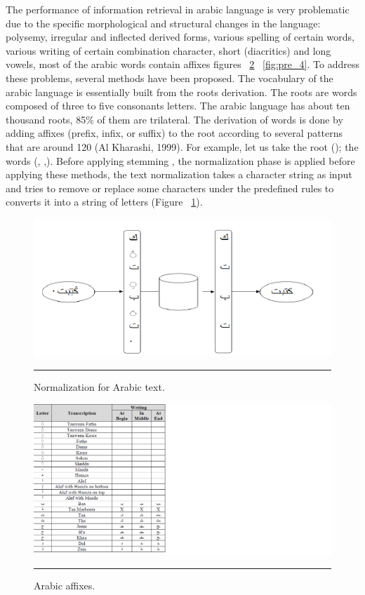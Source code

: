 The performance of information retrieval in arabic language is very problematic due to the specific morphological and structural changes in the language: polysemy, irregular and inflected derived forms, various spelling of certain words, various writing of certain combination character, short (diacritics) and long vowels, most of the arabic words contain affixes figures ~\ref{fig:pre_3} ~\ref{fig:pre_4}. To address these problems, several methods have been proposed.
The vocabulary of the arabic language is essentially built from the roots derivation. The roots are words composed of three to five consonants letters. The arabic language has about ten thousand roots, 85\% of them are trilateral. The derivation of words is done by adding affixes (prefix, infix, or suffix) to the root according to several patterns that are around 120 (Al Kharashi, 1999). For example, let us take the root (); the words (, ,).
Before applying stemming , the normalization phase is applied before applying these methods, the text normalization takes a character string as input and tries to remove or replace some characters under the predefined rules to converts it into a string of letters (Figure ~\ref{fig:pre_1}).

\begin{figure}[htbp]
	\centering
		\includegraphics{./Figures/pre_1.png}
		\rule{35em}{0.5pt}
	\caption[Normalization for Arabic text.]{Normalization for Arabic text.}
	\label{fig:pre_1}
\end{figure}

\begin{figure}[htbp]
	\centering
		\includegraphics{./Figures/pre_3.png}
		\rule{35em}{0.5pt}
	\caption[Arabic affixes.]{Arabic affixes.}
	\label{fig:pre_3}
\end{figure}

